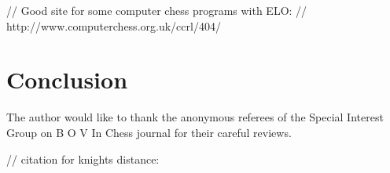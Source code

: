 \documentclass[10pt,preprint,twocolumn]{acmart}
\begin{document}





// Good site for some computer chess programs with ELO:
// http://www.computerchess.org.uk/ccrl/404/

\section{Conclusion}

The author would like to thank the anonymous referees
of the Special Interest Group on
B
O
V
In
Chess journal for their careful reviews.

\nocite{elo1978rating}
\nocite{topple}
// citation for knights distance:
\nocite{miller2013counting}

% 


\end{document}
